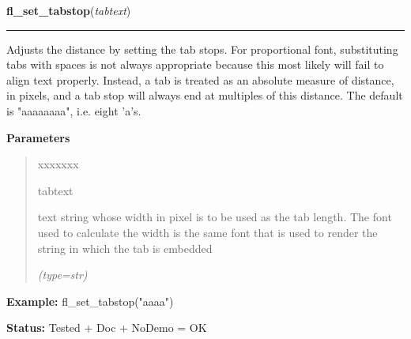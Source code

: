 \hspace{.8\funcindent}\begin{boxedminipage}{\funcwidth}

    \raggedright \textbf{fl\_set\_tabstop}(\textit{tabtext})

    \vspace{-1.5ex}

    \rule{\textwidth}{0.5\fboxrule}
\setlength{\parskip}{2ex}
    Adjusts the distance by setting the tab stops. For proportional font, 
    substituting tabs with spaces is not always appropriate because this 
    most likely will fail to align text properly. Instead, a tab is treated
    as an absolute measure of distance, in pixels, and a tab stop will 
    always end at multiples of this distance. The default is "aaaaaaaa", 
    i.e. eight 'a's.

\setlength{\parskip}{1ex}
      \textbf{Parameters}
      \vspace{-1ex}

      \begin{quote}
        \begin{Ventry}{xxxxxxx}

          \item[tabtext]

          text string whose width in pixel is to be used as the tab length.
          The font used to calculate the width is the same font that is 
          used to render the string in which the tab is embedded

            {\it (type=str)}

        \end{Ventry}

      \end{quote}

\textbf{Example:} fl\_set\_tabstop("aaaa")



\textbf{Status:} Tested + Doc + NoDemo = OK



    \end{boxedminipage}

    \label{xformslib:flxbasic:fl_get_defaults}

    \vspace{0.5ex}

